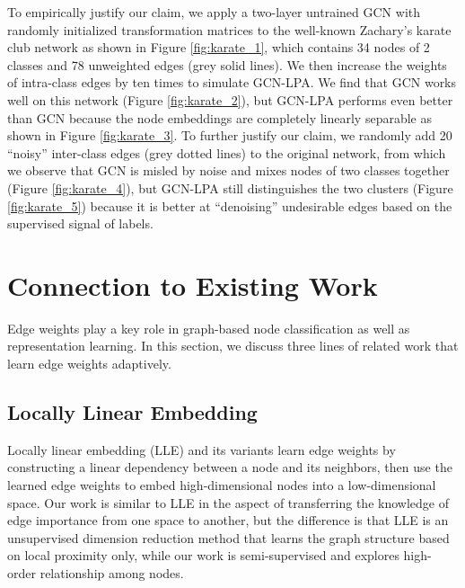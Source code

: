\documentclass{article}
\begin{document}
		To empirically justify our claim, we apply a two-layer untrained GCN with randomly initialized transformation matrices to the well-known Zachary's karate club network \citep{zachary1977information} as shown in Figure \ref{fig:karate_1}, which contains 34 nodes of 2 classes and 78 unweighted edges (grey solid lines).
		We then increase the weights of intra-class edges by ten times to simulate GCN-LPA.
		We find that GCN works well on this network (Figure \ref{fig:karate_2}), but GCN-LPA performs even better than GCN because the node embeddings are completely linearly separable as shown in Figure \ref{fig:karate_3}.
		To further justify our claim, we randomly add 20 ``noisy'' inter-class edges (grey dotted lines) to the original network, from which we observe that GCN is misled by noise and mixes nodes of two classes together (Figure \ref{fig:karate_4}), but GCN-LPA still distinguishes the two clusters (Figure \ref{fig:karate_5}) because it is better at ``denoising'' undesirable edges based on the supervised signal of labels.


\section{Connection to Existing Work}
\label{sec:existing_work}
	Edge weights play a key role in graph-based node classification as well as representation learning.
	In this section, we discuss three lines of related work that learn edge weights adaptively.
	
	\subsection{Locally Linear Embedding}
		Locally linear embedding (LLE) \citep{roweis2000nonlinear} and its variants \citep{zhang2007mlle, kong2012iterative} learn edge weights by constructing a linear dependency between a node and its neighbors, then use the learned edge weights to embed high-dimensional nodes into a low-dimensional space.
		Our work is similar to LLE in the aspect of transferring the knowledge of edge importance from one space to another, but the difference is that LLE is an unsupervised dimension reduction method that learns the graph structure based on local proximity only, while our work is semi-supervised and explores high-order relationship among nodes.
	
\end{document}
